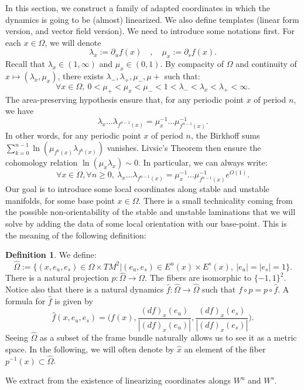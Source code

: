 \documentclass[a4paper]{article}
\theoremstyle{definition}
\newtheorem{definition}{Definition}[section]
\begin{document}
In this section, we construct a family of adapted coordinates in which the dynamics is going to be (almost) linearized. We also define templates (linear form version, and vector field version). We need to introduce some notations first. For each $x \in \Omega$, we will denote
$$ \lambda_x := \partial_u f(x) \quad, \quad \mu_x := \partial_s f(x). $$
Recall that $\lambda_x \in (1,\infty)$ and $\mu_x \in (0,1)$. By compacity of $\Omega$ and continuity of $x \mapsto (\lambda_x,\mu_x)$, there exists $\lambda_-,\lambda_+,\mu_-,\mu+$ such that:
$$ \forall x \in \Omega, \ 0 < \mu_+ < \mu_x <\mu_- < 1 < \lambda_- < \lambda_x < \lambda_+ < \infty. $$
The area-preserving hypothesis ensure that, for any periodic point $x$ of period $n$, we have
$$ \lambda_x \dots \lambda_{f^{n-1}(x)} = \mu_x^{-1} \dots \mu_{f^{n-1}(x)}^{-1} .$$
In other words, for any periodic point $x$ of period $n$, the Birkhoff sums $\sum_{k=0}^{n-1} \ln(\mu_{f^k(x)} \lambda_{f^{k}(x)})$ vanishes. Livsic's Theorem \cite{Liv71} then ensure the cohomology relation $\ln(\mu_x \lambda_x) \sim 0$. In particular, we can always write:
$$\forall x \in \Omega, \forall n \geq 0, \  \lambda_x \dots \lambda_{f^{n-1}(x)} = \mu_x^{-1} \dots \mu_{f^{n-1}(x)}^{-1} e^{O(1)} . $$
Our goal is to introduce some local coordinates along stable and unstable manifolds, for some base point $x \in \Omega$. There is a small technicality coming from the possible non-orientability of the stable and unstable laminations that we will solve by adding the data of some local orientation with our base-point. This is the meaning of the following definition:

\begin{definition}
We define: $$\widehat{\Omega} := \Big\{ (x,e_u,e_s) \in \Omega \times TM^2 \Big|  (e_u,e_s) \in E^u(x) \times E^s(x), \ |e_u|=|e_s|=1 \Big\}.$$
There is a natural projection $p: \widehat{\Omega} \rightarrow \Omega$. The fibers are isomorphic to $\{-1,1\}^2$. Notice also that there is a natural dynamics $\widehat{f} : \widehat{\Omega} \rightarrow \widehat{\Omega}$ such that $f \circ p = p \circ \widehat{f}$. A formula for $\widehat{f}$ is given by
$$ \widehat{f}(x,e_u,e_s) = \Big(f(x), \frac{(df)_x(e_u)}{|(df)_x(e_u)|}, \frac{(df)_x(e_s)}{|(df)_x(e_s)|}\Big). $$
Seeing $\widehat{\Omega}$ as a subset of the frame bundle naturally allows us to see it as a metric space. In the following, we will often denote by $\widehat{x}$ an element of the fiber $p^{-1}(x) \subset \widehat{\Omega}$.
\end{definition}

We extract from \cite{KK07} the existence of linearizing coordinates alongs $W^u$ and $W^s$.
\end{document}

